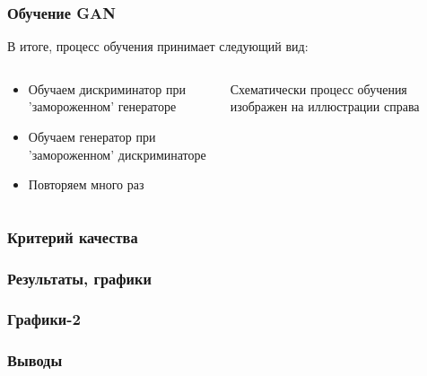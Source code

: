 \documentclass[9pt]{beamer}
\begin{document}
\begin{frame}\frametitle{Обучение GAN}
	В итоге, процесс обучения принимает следующий вид:
	\begin{columns}
			\begin{center}
				\begin{itemize}
					\item Обучаем дискриминатор при 'замороженном' генераторе
					\item Обучаем генератор при 'замороженном' дискриминаторе
					\item Повторяем много раз
				\end{itemize}
			\end{center}
			Схематически процесс обучения изображен на иллюстрации справа
	\end{columns}
	
\end{frame}

\begin{frame}\frametitle{Критерий качества}
	
\end{frame}

\begin{frame}\frametitle{Результаты, графики}
\end{frame}

\begin{frame}\frametitle{Графики-2}
\end{frame}

\begin{frame}\frametitle{Выводы}
\end{frame}
\end{document}

